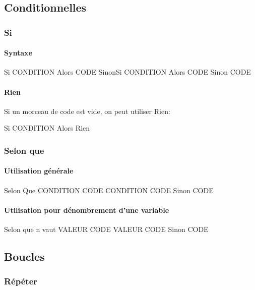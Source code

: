 \documentclass[10pt,a4paper,french]{article}
\begin{document}
\subsection{Conditionnelles}

\subsubsection{Si}

\paragraph{Syntaxe}
\begin{exalgo}
Si CONDITION Alors
    CODE
SinonSi CONDITION Alors
    CODE
Sinon
    CODE
\end{exalgo}

\paragraph{Rien}
Si un morceau de code est vide, on peut utiliser Rien:
\begin{exalgo}
Si CONDITION Alors
    Rien
\end{exalgo}

\subsubsection{Selon que}

\paragraph{Utilisation générale}
\begin{exalgo}
Selon Que
    CONDITION
        CODE
    CONDITION
        CODE
    Sinon
        CODE
\end{exalgo}

\paragraph{Utilisation pour dénombrement d'une variable}
\begin{exalgo}
Selon que n vaut
    VALEUR
        CODE
    VALEUR
        CODE
    Sinon
        CODE
\end{exalgo}

\subsection{Boucles}

\subsubsection{Répéter}
\end{document}
